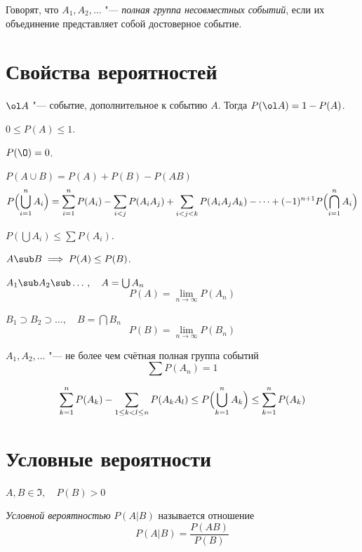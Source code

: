 \begin{definition}
	Говорят, что $ A_1, A_2, \dotsc $ "--- \emph{полная группа несовместных событий},
	если их объединение представляет собой достоверное событие.
\end{definition}

\section{Свойства вероятностей}

\begin{props}
\item $ \ol A $ "--- событие, дополнительное к событию $ A $.
	Тогда $ P(\ol A) = 1 - P(A) $.
\item $ 0 \le P(A) \le 1 $.
\item $ P(\O) = 0 $.
\item $ P(A \cup B) = P(A) + P(B) - P(AB) $
	$$ P \Bigl( \bigcup_{i = 1}^n A_i \Bigr) =
	\sum_{i = 1}^n P(A_i) - \sum_{i < j} P(A_iA_j) + \sum_{i < j < k}P(A_iA_jA_k) -
	\dots + (-1)^{n + 1}P \Bigl( \bigcap_{i = 1}^n A_i \Bigr) $$
\item $ P(\bigcup A_i) \le \sum P(A_i) $.
\item $ A \sub B \implies P(A) \le P(B) $.
\item $ A_1 \sub A_2 \sub \dotso, \quad A = \bigcup A_n $
	$$ P(A) = \lim\limits_{n \to \infty} P(A_n) $$
\item $ B_1 \supset B_2 \supset \dotso, \quad B = \bigcap B_n $
	$$ P(B) = \lim\limits_{n \to \infty} P(B_n) $$
\item $ A_1, A_2, \dotsc $ "--- не более чем счётная полная группа событий
	$$ \sum P(A_n) = 1 $$
\end{props}

\begin{statement}
	$$ \sum_{k = 1}^n P(A_k) - \sum_{1 \le k < l \le n} P(A_kA_l) \le
	P \Bigl( \bigcup_{k = 1}^n A_k \Bigr) \le \sum_{k = 1}^n P(A_k) $$
\end{statement}

\section{Условные вероятности}

\begin{definition}
	$ A, B \in \Im, \quad P(B) > 0 $

	\emph{Условной вероятностью} $ P(A|B) $ называется отношение
	$$ P(A|B) = \frac{P(AB)}{P(B)} $$
\end{definition}

